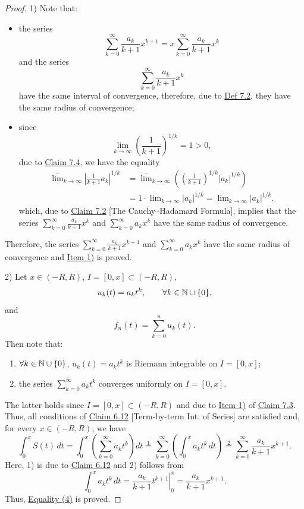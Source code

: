 \begin{proof}
1) Note that:
\begin{itemize}
    \item the series
    \[
    \sum_{k=0}^{\infty}\frac{a_k}{k+1}x^{k+1}
    =
    x\sum_{k=0}^{\infty}\frac{a_k}{k+1}x^k
    \]
    and the series
    \[
    \sum_{k=0}^{\infty}\frac{a_k}{k+1}x^k
    \]
    have the same interval of convergence, therefore, due to \hyperref[def:7.2]{Def 7.2}, they have the same radius of convergence;

    \item since
    \[
    \lim_{k\to\infty}\left(\frac{1}{k+1}\right)^{1/k}=1>0,
    \]
    due to \hyperref[claim:7.4]{Claim 7.4}, we have the equality
    \[
    \begin{aligned}
    \overline{\lim}_{k\to\infty}\left|\frac{1}{k+1}a_k\right|^{1/k}
    &=\overline{\lim}_{k\to\infty}\left(\left(\frac{1}{k+1}\right)^{1/k}|a_k|^{1/k}\right)\\
    &=1\cdot\overline{\lim}_{k\to\infty}|a_k|^{1/k}
    =\overline{\lim}_{k\to\infty}|a_k|^{1/k}.
    \end{aligned}
    \]
    which, due to \hyperref[claim:7.2]{Claim 7.2} [The Cauchy--Hadamard Formula], implies that the series $\sum_{k=0}^{\infty}\frac{a_k}{k+1}x^k$ and $\sum_{k=0}^{\infty}a_kx^k$ have the same radius of convergence.
\end{itemize}
Therefore, the series $\sum_{k=0}^{\infty}\frac{a_k}{k+1}x^{k+1}$ and $\sum_{k=0}^{\infty}a_kx^k$ have the same radius of convergence and \hyperref[item:claim:7.7:1]{Item 1)} is proved.

2) Let $x\in(-R,R)$, $I=[0,x]\subset(-R,R)$,
\[
u_k(t)=a_kt^k,
\qquad \forall k\in\mathbb{N}\cup\{0\},
\]
and
\[
f_n(t)=\sum_{k=0}^{n}u_k(t).
\]
Then note that:
\begin{enumerate}[label=\alph*)]
    \item $\forall k\in\mathbb{N}\cup\{0\}$, $u_k(t)=a_kt^k$ is Riemann integrable on $I=[0,x]$;

    \item the series $\sum_{k=0}^{\infty}a_kt^k$ converges uniformly on $I=[0,x]$.
\end{enumerate}
The latter holds since $I=[0,x]\subset(-R,R)$ and due to \hyperref[item:claim:7.3:1]{Item 1)} of \hyperref[claim:7.3]{Claim 7.3}.
Thus, all conditions of \hyperref[claim:6.12]{Claim 6.12} [Term-by-term Int. of Series] are satisfied and, for every $x\in(-R,R)$, we have
\[
\int_0^x S(t)\,dt
=
\int_0^x\left(\sum_{k=0}^{\infty}a_kt^k\right)dt
\overset{1}{=}
\sum_{k=0}^{\infty}\left(\int_0^x a_kt^k\,dt\right)
\overset{2}{=}
\sum_{k=0}^{\infty}\frac{a_k}{k+1}x^{k+1}.
\]
Here, 1) is due to \hyperref[claim:6.12]{Claim 6.12} and 2) follows from
\[
\int_0^x a_kt^k\,dt
=
\left.\frac{a_k}{k+1}t^{k+1}\right|_0^x
=
\frac{a_k}{k+1}x^{k+1}.
\]
Thus, \hyperref[eq:7:4:1]{Equality (4)} is proved.
\end{proof}


